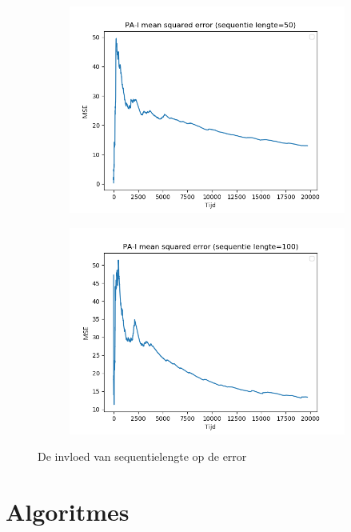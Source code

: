 \begin{figure}[t!]
\begin{subfigure}{.49\textwidth}
  \includegraphics[width=\linewidth]{images/evaluatie/seqlen50.png} 
\end{subfigure}
\begin{subfigure}{.49\textwidth}
  \centering
  \includegraphics[width=\linewidth]{images/evaluatie/seqlen100.png}   
\end{subfigure}
\caption{De invloed van sequentielengte op de error}
\label{fig:seqlen error}
\end{figure}
\section{Algoritmes}

